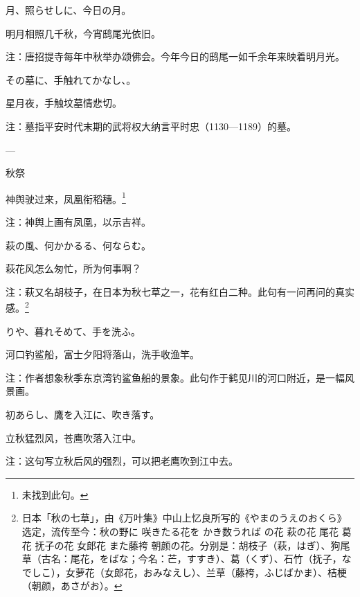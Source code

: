 \begin{haiku}
    {\FH 月、照らせしに、今日の月。}

    {\FK 明月相照几千秋，今宵鸱尾光依旧。}

    {\FT 注：唐招提寺每年中秋举办颂佛会。今年今日的鸱尾一如千余年来映着明月光。}
\end{haiku}

\begin{haiku}
    {\FH その墓に、手触れてかなし、。}

    {\FK 星月夜，手触坟墓情悲切。}

    {\FT 注：墓指平安时代末期的武将权大纳言平时忠（1130—1189）的墓。}
\end{haiku}

\begin{haiku}
    {\FH ---}

    {\FK 秋祭}

    {\FK 神舆驶过来，凤凰衔稻穗。\footnote{\FT 未找到此句。}}

    {\FT 注：神舆上画有凤凰，以示吉祥。}
\end{haiku}

\begin{haiku}
    {\FH 萩の風、何かかるる、何ならむ。}

    {\FK 萩花风怎么匆忙，所为何事啊？}

    {\FT 注：萩又名胡枝子，在日本为秋七草之一，花有红白二种。此句有一问再问的真实感。\footnote{\FT 日本「秋の七草」，由《万叶集》中山上忆良所写的《やまのうえのおくら》选定，流传至今：秋の野に 咲きたる花を  かき数うれば の花 萩の花 尾花 葛花 抚子の花 女郎花 また藤袴 朝颜の花。分别是：胡枝子（萩，はぎ）、狗尾草（古名：尾花，をばな；今名：芒，すすき）、葛（くず）、石竹（抚子，なでしこ），女萝花（女郎花，おみなえし）、兰草（藤袴，ふじばかま）、桔梗（朝颜，あさがお）。}}

\end{haiku}

\begin{haiku}
    {\FH {}りや、暮れそめて、手を洗ふ。}

    {\FK 河口钓鲨船，富士夕阳将落山，洗手收渔竿。}

    {\FT 注：作者想象秋季东京湾钓鲨鱼船的景象。此句作于鹤见川的河口附近，是一幅风景画。}
\end{haiku}

\begin{haiku}
    {\FH 初あらし、鷹を入江に、吹き落す。}

    {\FK 立秋猛烈风，苍鹰吹落入江中。}

    {\FT 注：这句写立秋后风的强烈，可以把老鹰吹到江中去。}
\end{haiku}

